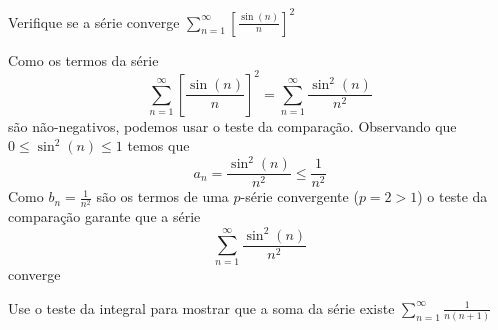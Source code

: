 \documentclass[a4paper,12pt,fleqn]{article}
\begin{document}
Verifique se a série converge \;
\(
  \sum_{n=1}^\infty \left[\frac{\sin(n)}{n}\right]^2
\)

\begin{answer}
  Como os termos da série
  \[
    \sum_{n=1}^\infty \left[\frac{\sin(n)}{n}\right]^2
    = \sum_{n=1}^\infty \frac{\sin^2(n)}{n^2}
  \]
  são não-negativos, podemos usar o teste da comparação.
  Observando que
  \(
    0 \leq \sin^2(n) \leq 1
  \)
  temos que
  \[
    a_n = \frac{\sin^2(n)}{n^2} \leq \frac{1}{n^2}
  \]
  Como \(b_n = \frac{1}{n^2}\) são os termos de uma $p$-série convergente
  (\(p=2>1\))
  o teste da comparação garante que a série
  \[
    \sum_{n=1}^\infty \frac{\sin^2(n)}{n^2}
  \]
  converge
\end{answer}

Use o teste da integral para mostrar que a soma da série existe \;
\(
  \sum_{n=1}^{\infty} \frac{1}{n(n+1)}
\)
\end{document}
